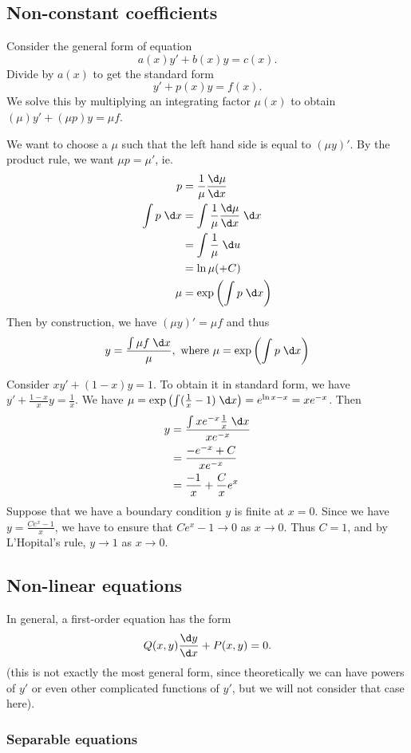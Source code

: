 \documentclass[a4paper]{article}
\begin{document}
\subsection{Non-constant coefficients}
Consider the general form of equation
\[
  a(x)y' + b(x)y = c(x).
\]
Divide by $a(x)$ to get the standard form
\[
  y' + p(x) y  = f(x).
\]
We solve this by multiplying an integrating factor $\mu (x)$ to obtain $(\mu)y' + (\mu p)y = \mu f$.

We want to choose a $\mu$ such that the left hand side is equal to $(\mu y)'$. By the product rule, we want $\mu p = \mu'$, ie.
\begin{align*}
  p &= \frac{1}{\mu}\frac{\d\mu }{\d x}\\
  \int p\; \d x &= \int \frac{1}{\mu}\frac{\d \mu}{\d x} \; \d x\\
  &= \int \frac{1}{\mu}\; \d u\\
  &= \ln \mu (+ C)\\
  \mu &= \exp\left(\int p\; \d x\right)
\end{align*}
Then by construction, we have $(\mu y)' = \mu f$ and thus
\[
  y = \frac{\int \mu f\;\d x}{\mu},\text{ where } \mu = \exp\left(\int p\; \d x\right)
\]
\begin{eg}
  Consider $xy' + (1 - x)y = 1$. To obtain it in standard form, we have $y' + \frac{1 - x}{x} y = \frac{1}{x}$.
  We have $\mu = \exp\left(\int (\frac{1}{x} - 1)\; \d x\right) = e^{\ln x - x} = xe^{-x}$. Then
  \begin{align*}
    y &= \frac{\int xe^{-x}\frac{1}{x}\;\d x}{xe^{-x}}\\
    &= \frac{-e^{-x} + C}{xe^{-x}}\\
    &= \frac{-1}{x} + \frac{C}{x}e^x
  \end{align*}
  Suppose that we have a boundary condition $y$ is finite at $x = 0$. Since we have $y = \frac{Ce^x - 1}{x}$, we have to ensure that $Ce^x - 1\to 0$ as $x\to 0$. Thus $C = 1$, and by L'Hopital's rule, $y\to 1$ as $x\to 0$.
\end{eg}

\subsection{Non-linear equations}
In general, a first-order equation has the form
\[
  Q(x, y)\frac{\d y}{\d x} + P(x, y) = 0.
\]
(this is not exactly the most general form, since theoretically we can have powers of $y'$ or even other complicated functions of $y'$, but we will not consider that case here).
\subsubsection{Separable equations}
\end{document}
